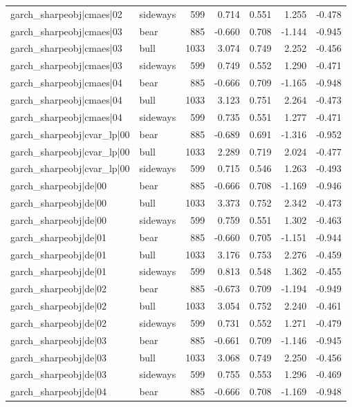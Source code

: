 \begin{table}
\begin{tabular}{llrrrrr}
garch\_sharpeobj|cmaes|02 & sideways & 599 & 0.714 & 0.551 & 1.255 & -0.478 \\
garch\_sharpeobj|cmaes|03 & bear & 885 & -0.660 & 0.708 & -1.144 & -0.945 \\
garch\_sharpeobj|cmaes|03 & bull & 1033 & 3.074 & 0.749 & 2.252 & -0.456 \\
garch\_sharpeobj|cmaes|03 & sideways & 599 & 0.749 & 0.552 & 1.290 & -0.471 \\
garch\_sharpeobj|cmaes|04 & bear & 885 & -0.666 & 0.709 & -1.165 & -0.948 \\
garch\_sharpeobj|cmaes|04 & bull & 1033 & 3.123 & 0.751 & 2.264 & -0.473 \\
garch\_sharpeobj|cmaes|04 & sideways & 599 & 0.735 & 0.551 & 1.277 & -0.471 \\
garch\_sharpeobj|cvar\_lp|00 & bear & 885 & -0.689 & 0.691 & -1.316 & -0.952 \\
garch\_sharpeobj|cvar\_lp|00 & bull & 1033 & 2.289 & 0.719 & 2.024 & -0.477 \\
garch\_sharpeobj|cvar\_lp|00 & sideways & 599 & 0.715 & 0.546 & 1.263 & -0.493 \\
garch\_sharpeobj|de|00 & bear & 885 & -0.666 & 0.708 & -1.169 & -0.946 \\
garch\_sharpeobj|de|00 & bull & 1033 & 3.373 & 0.752 & 2.342 & -0.473 \\
garch\_sharpeobj|de|00 & sideways & 599 & 0.759 & 0.551 & 1.302 & -0.463 \\
garch\_sharpeobj|de|01 & bear & 885 & -0.660 & 0.705 & -1.151 & -0.944 \\
garch\_sharpeobj|de|01 & bull & 1033 & 3.176 & 0.753 & 2.276 & -0.459 \\
garch\_sharpeobj|de|01 & sideways & 599 & 0.813 & 0.548 & 1.362 & -0.455 \\
garch\_sharpeobj|de|02 & bear & 885 & -0.673 & 0.709 & -1.194 & -0.949 \\
garch\_sharpeobj|de|02 & bull & 1033 & 3.054 & 0.752 & 2.240 & -0.461 \\
garch\_sharpeobj|de|02 & sideways & 599 & 0.731 & 0.552 & 1.271 & -0.479 \\
garch\_sharpeobj|de|03 & bear & 885 & -0.661 & 0.709 & -1.146 & -0.945 \\
garch\_sharpeobj|de|03 & bull & 1033 & 3.068 & 0.749 & 2.250 & -0.456 \\
garch\_sharpeobj|de|03 & sideways & 599 & 0.755 & 0.553 & 1.296 & -0.469 \\
garch\_sharpeobj|de|04 & bear & 885 & -0.666 & 0.708 & -1.169 & -0.948 \\

\end{tabular}
\end{table}
